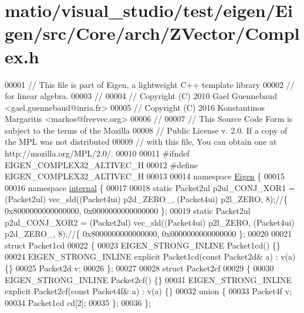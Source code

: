 \hypertarget{matio_2visual__studio_2test_2eigen_2_eigen_2src_2_core_2arch_2_z_vector_2_complex_8h_source}{}\section{matio/visual\+\_\+studio/test/eigen/\+Eigen/src/\+Core/arch/\+Z\+Vector/\+Complex.h}
\label{matio_2visual__studio_2test_2eigen_2_eigen_2src_2_core_2arch_2_z_vector_2_complex_8h_source}

\begin{DoxyCode}
00001 \textcolor{comment}{// This file is part of Eigen, a lightweight C++ template library}
00002 \textcolor{comment}{// for linear algebra.}
00003 \textcolor{comment}{//}
00004 \textcolor{comment}{// Copyright (C) 2010 Gael Guennebaud <gael.guennebaud@inria.fr>}
00005 \textcolor{comment}{// Copyright (C) 2016 Konstantinos Margaritis <markos@freevec.org>}
00006 \textcolor{comment}{//}
00007 \textcolor{comment}{// This Source Code Form is subject to the terms of the Mozilla}
00008 \textcolor{comment}{// Public License v. 2.0. If a copy of the MPL was not distributed}
00009 \textcolor{comment}{// with this file, You can obtain one at http://mozilla.org/MPL/2.0/.}
00010 
00011 \textcolor{preprocessor}{#ifndef EIGEN\_COMPLEX32\_ALTIVEC\_H}
00012 \textcolor{preprocessor}{#define EIGEN\_COMPLEX32\_ALTIVEC\_H}
00013 
00014 \textcolor{keyword}{namespace }\hyperlink{namespace_eigen}{Eigen} \{
00015 
00016 \textcolor{keyword}{namespace }\hyperlink{namespaceinternal}{internal} \{
00017 
00018 \textcolor{keyword}{static} Packet2ul  p2ul\_CONJ\_XOR1 = (Packet2ul) vec\_sld((Packet4ui) p2d\_ZERO\_, (Packet4ui) p2l\_ZERO, 8);\textcolor{comment}{//\{
       0x8000000000000000, 0x0000000000000000 \};}
00019 \textcolor{keyword}{static} Packet2ul  p2ul\_CONJ\_XOR2 = (Packet2ul) vec\_sld((Packet4ui) p2l\_ZERO,  (Packet4ui) p2d\_ZERO\_, 8);\textcolor{comment}{//\{
       0x8000000000000000, 0x0000000000000000 \};}
00020 
00021 \textcolor{keyword}{struct }Packet1cd
00022 \{
00023   EIGEN\_STRONG\_INLINE Packet1cd() \{\}
00024   EIGEN\_STRONG\_INLINE \textcolor{keyword}{explicit} Packet1cd(\textcolor{keyword}{const} Packet2d& a) : v(a) \{\}
00025   Packet2d v;
00026 \};
00027 
00028 \textcolor{keyword}{struct }Packet2cf
00029 \{
00030   EIGEN\_STRONG\_INLINE Packet2cf() \{\}
00031   EIGEN\_STRONG\_INLINE \textcolor{keyword}{explicit} Packet2cf(\textcolor{keyword}{const} Packet4f& a) : v(a) \{\}
00032   \textcolor{keyword}{union }\{
00033     Packet4f v;
00034     Packet1cd cd[2];
00035   \};
00036 \};

\end{DoxyCode}
